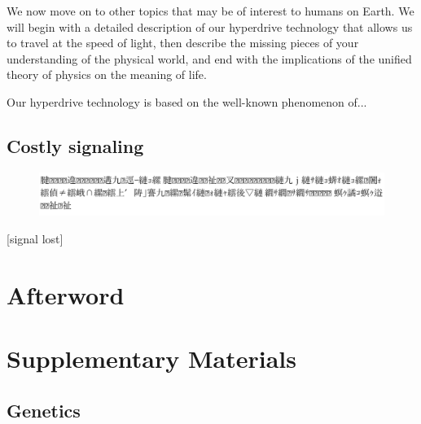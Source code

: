\documentclass{report}
\begin{document}
We now move on to other topics that may be of interest to humans on Earth. We will begin with a detailed description of our hyperdrive technology that allows us to travel at the speed of light, then describe the missing pieces of your understanding of the physical world, and end with the implications of the unified theory of physics on the meaning of life.

Our hyperdrive technology is based on the well-known phenomenon of... 

\section*{Costly signaling}
\begin{figure}[htb!]
\includegraphics[width=.75\columnwidth]{costlysignaling.png}
\end{figure}
[signal lost]


\chapter*{Afterword}


\chapter*{Supplementary Materials}

%





%





\section*{Genetics}

\end{document}
